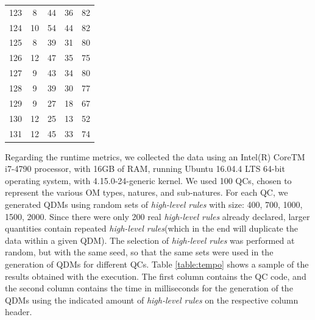 \documentclass[twocolumn]{bmcart}%
\newcommand{\callers}{\emph{high-level rules}\xspace}
\begin{document}
\begin{table}[htb!]
\begin{center}
\begin{tabular}{ccccc}
123               & 8            & 44            & 36                 & 82                      \\ 
124               & 10           & 54            & 44                 & 82                      \\ 
125               & 8            & 39            & 31                 & 80                      \\ 
126               & 12           & 47            & 35                 & 75                      \\ 
127               & 9            & 43            & 34                 & 80                      \\ 
128               & 9            & 39            & 30                 & 77                      \\ 
129               & 9            & 27            & 18                 & 67                      \\ 
130               & 12           & 25            & 13                 & 52                      \\ 
131               & 12           & 45            & 33                 & 74                      \\ \bottomrule
		\end{tabular}
	\end{center}
\end{table}

Regarding the runtime metrics, we collected the data using an Intel(R) Core{TM} i7-4790 processor, with 16GB of RAM, running Ubuntu 16.04.4 LTS 64-bit operating system, with 4.15.0-24-generic kernel. We used 100 QCs, chosen to represent the various OM types, natures, and sub-natures. For each QC, we generated QDMs using random sets of \callers with size: 400, 700, 1000, 1500, 2000. Since there were only 200 real \callers already declared, larger quantities contain repeated \callers (which in the end will duplicate the data within a given QDM). The selection of \callers was performed at random, but with the same seed, so that the same sets were used in the generation of QDMs for different QCs. Table \ref{table:tempo} shows a sample of the results obtained with the execution. The first column contains the QC code, and the second column contains the time in milliseconds for the generation of the QDMs using the indicated amount of \callers on the respective column header.

\end{document}
